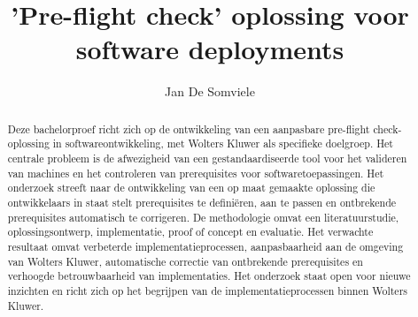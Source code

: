 \documentclass{hogent-article}
\title{'Pre-flight check' oplossing voor software deployments}
\author{Jan De Somviele}
\begin{document}
\begin{abstract}
Deze bachelorproef richt zich op de ontwikkeling van een aanpasbare pre-flight check-oplossing in softwareontwikkeling, met Wolters Kluwer als specifieke doelgroep. Het centrale probleem is de afwezigheid van een gestandaardiseerde tool voor het valideren van machines en het controleren van prerequisites voor softwaretoepassingen. Het onderzoek streeft naar de ontwikkeling van een op maat gemaakte oplossing die ontwikkelaars in staat stelt prerequisites te definiëren, aan te passen en ontbrekende prerequisites automatisch te corrigeren. De methodologie omvat een literatuurstudie, oplossingsontwerp, implementatie, proof of concept en evaluatie. Het verwachte resultaat omvat verbeterde implementatieprocessen, aanpasbaarheid aan de omgeving van Wolters Kluwer, automatische correctie van ontbrekende prerequisites en verhoogde betrouwbaarheid van implementaties. Het onderzoek staat open voor nieuwe inzichten en richt zich op het begrijpen van de implementatieprocessen binnen Wolters Kluwer.
\end{abstract}

\tableofcontents



\printbibliography[heading=bibintoc]
\end{document}
